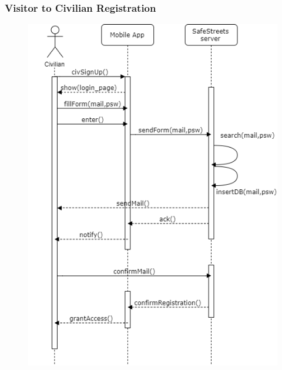 \documentclass[12pt,a4paper]{article}
\begin{document}
\subsubsection{Visitor to Civilian Registration}
			\begin{figure}[H]
				\centering
				\includegraphics[width=.9\textwidth,height=.9\textheight,keepaspectratio]{Images/registration_sequence}
				\label{fig:registration_sequence}
			\end{figure}
\end{document}
